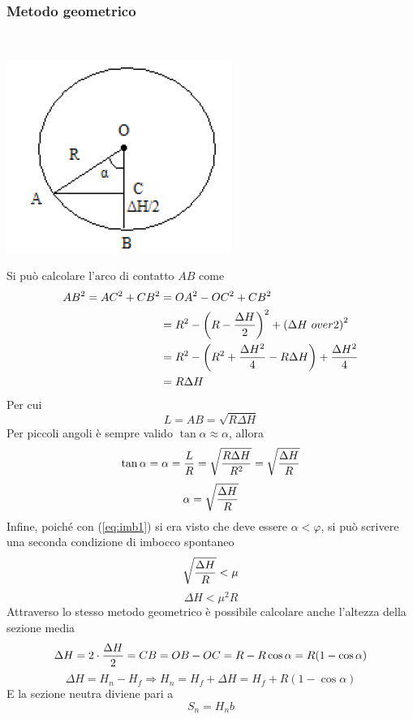 \documentclass[a4paper, 15pt]{article}
\begin{document}
	\subsubsection{Metodo geometrico}\mbox{} \\
\begin{center}
	\includegraphics[width=0.5\linewidth]{figures/def10}
\end{center}
	Si può calcolare l'arco di contatto $AB$ come 
	\[\begin{aligned}
		AB^2 = AC^2 + CB^2 &= OA^2 - OC^2 + CB^2\\
		&= R^2 - \left(R-{\Delta H\over2}\right)^2 + \left(\Delta H\ over2\right)^2 \\
		&= R^2 - \left(R^2+{\Delta H^2\over4} - R\Delta H\right) + {\Delta H^2\over4} \\
		& = R\Delta H
	\end{aligned}\]
	Per cui
	\[L = AB = \sqrt{R\Delta H}\]
	Per piccoli angoli è sempre valido $\tan\alpha\approx\alpha$, allora  
	\[\tan\alpha = \alpha = {L\over R} = \sqrt{R\Delta H\over R^2} = \sqrt{\Delta H\over R}\]
	\[\alpha = \sqrt{\Delta H\over R}\]
	Infine, poiché con (\ref{eq:imb1}) si era visto che deve essere $\alpha<\varphi$, si può scrivere una seconda condizione di imbocco spontaneo
	\[\sqrt{\Delta H\over R}<\mu\]
	\begin{equation}\label{eq:imb2}
		\boxed{\Delta H <\mu^2R}
	\end{equation}
	Attraverso lo stesso metodo geometrico è possibile calcolare anche l'altezza della sezione media
	\[\Delta H = 2\cdot{\Delta H\over2} = CB = OB - OC = R - R\cos\alpha = R(1-\cos\alpha)\] 
	\[\Delta H = H_n - H_f \Rightarrow H_n = H_f + \Delta H = H_f + R(1-\cos\alpha)\]
	E la sezione neutra diviene pari a 
	\[S_n = H_nb\]
	\newpage
\end{document}
